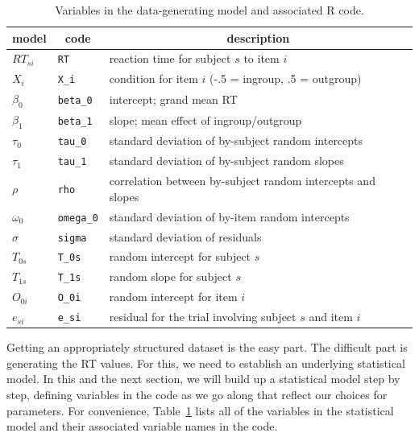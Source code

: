 \documentclass[
  english,
  doc,floatsintext]{apa6}
\begin{document}
\begin{table}[H]

\begin{center}
\begin{threeparttable}

\caption{\label{tab:paramdef}Variables in the data-generating model and associated R code.}

\begin{tabular}{lll}
\toprule
model & \multicolumn{1}{c}{code} & \multicolumn{1}{c}{description}\\
\midrule
$RT_{si}$ & \texttt{RT} & reaction time for subject $s$ to item $i$\\
$X_i$ & \texttt{X\_i} & condition for item $i$ (-.5 = ingroup, .5 = outgroup)\\
$\beta_0$ & \texttt{beta\_0} & intercept; grand mean RT\\
$\beta_1$ & \texttt{beta\_1} & slope; mean effect of ingroup/outgroup\\
$\tau_0$ & \texttt{tau\_0} & standard deviation of by-subject random intercepts\\
$\tau_1$ & \texttt{tau\_1} & standard deviation of by-subject random slopes\\
$\rho$ & \texttt{rho} & correlation between by-subject random intercepts and slopes\\
$\omega_0$ & \texttt{omega\_0} & standard deviation of by-item random intercepts\\
$\sigma$ & \texttt{sigma} & standard deviation of residuals\\
$T_{0s}$ & \texttt{T\_0s} & random intercept for subject $s$\\
$T_{1s}$ & \texttt{T\_1s} & random slope for subject $s$\\
$O_{0i}$ & \texttt{O\_0i} & random intercept for item $i$\\
$e_{si}$ & \texttt{e\_si} & residual for the trial involving subject $s$ and item $i$\\
\bottomrule
\end{tabular}

\end{threeparttable}
\end{center}

\end{table}

Getting an appropriately structured dataset is the easy part. The difficult part is generating the RT values. For this, we need to establish an underlying statistical model. In this and the next section, we will build up a statistical model step by step, defining variables in the code as we go along that reflect our choices for parameters. For convenience, Table~\ref{tab:paramdef} lists all of the variables in the statistical model and their associated variable names in the code.
\end{document}
